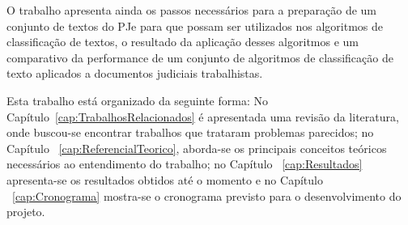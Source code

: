 O trabalho apresenta ainda os passos necessários para a preparação de um conjunto de textos do PJe para que possam ser utilizados nos algoritmos de classificação de textos, o resultado da aplicação desses algoritmos e um comparativo da performance de um conjunto de algoritmos de classificação de texto aplicados a documentos judiciais trabalhistas. 






Esta trabalho está organizado da seguinte forma: No Capítulo~\ref{cap:TrabalhosRelacionados} é apresentada uma revisão da literatura, onde buscou-se encontrar trabalhos que trataram problemas parecidos; no Capítulo ~\ref{cap:ReferencialTeorico}, aborda-se os principais conceitos teóricos necessários ao entendimento do trabalho; no Capítulo ~\ref{cap:Resultados} apresenta-se os resultados obtidos até o momento e no Capítulo ~\ref{cap:Cronograma} mostra-se o cronograma previsto para o desenvolvimento do projeto.